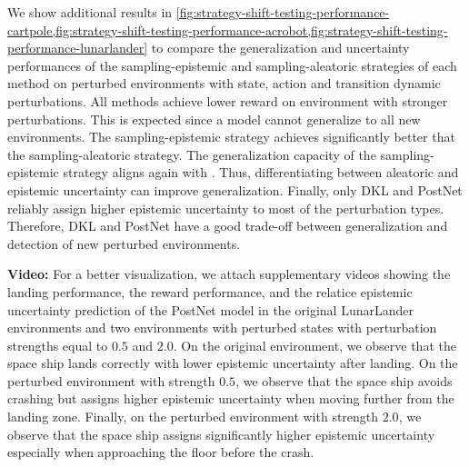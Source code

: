 
%
%
%

We show additional results in \cref{fig:strategy-shift-testing-performance-cartpole,fig:strategy-shift-testing-performance-acrobot,fig:strategy-shift-testing-performance-lunarlander} to compare the generalization and uncertainty performances of the sampling-epistemic and sampling-aleatoric strategies of each method on perturbed environments with state, action and transition dynamic perturbations. All methods achieve lower reward on environment with stronger perturbations. This is expected since a model cannot generalize to all new environments. The sampling-epistemic strategy achieves significantly better that the sampling-aleatoric strategy. The generalization capacity of the sampling-epistemic strategy aligns again with \citep{epistemic-pomdp}. Thus, differentiating between aleatoric and epistemic uncertainty can improve generalization. Finally, only DKL and PostNet reliably assign higher epistemic uncertainty to most of the perturbation types. Therefore, DKL and PostNet have a good trade-off between generalization and detection of new perturbed environments.

\textbf{Video:} For a better visualization, we attach supplementary videos showing the landing performance, the reward performance, and the relatice epistemic uncertainty prediction of the PostNet model in the original LunarLander environments and two environments with perturbed states with perturbation strengths equal to $0.5$ and $2.0$. On the original environment, we observe that the space ship lands correctly with lower epistemic uncertainty after landing. On the perturbed environment with strength $0.5$, we observe that the space ship avoids crashing but assigns higher epistemic uncertainty when moving further from the landing zone. Finally, on the perturbed environment with strength $2.0$, we observe that the space ship assigns significantly higher epistemic uncertainty especially when approaching the floor before the crash.


% 
% 
% 

